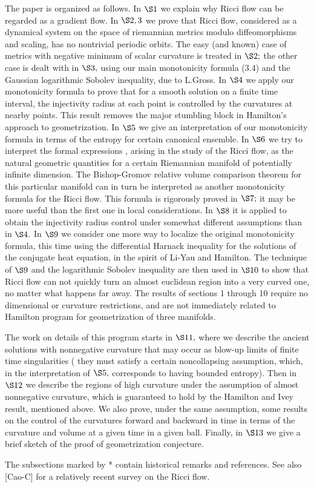 \documentclass[12pt]{article}
\theoremstyle{plain}
{\swapnumbers
\newtheorem{thm}{Theorem}[section]
\newtheorem{cor}[thm]{Corollary}
\newtheorem{lem}[thm]{Lemma}
\newtheorem{prop}[thm]{Proposition}
}
\theoremstyle{definition}
{\swapnumbers
\newtheorem{defn}[thm]{Definition}
\newtheorem{nota}[thm]{Notation}
\newtheorem{parag}[thm]{}
\newtheorem*{parstr}{\addtocounter{thm}{1}\thesection.\arabic{thm}*}
\newtheorem*{intropar}{\addtocounter{thm}{1}\arabic{thm}}
}
\theoremstyle{remark} {\swapnumbers
\newtheorem{rem}[thm]{Remark}
\newtheorem{exam}[thm]{Example}
\newtheorem{lemma}[thm]{Lemma}
\newtheorem{claim}[thm]{Claim}
}
\numberwithin{equation}{section}
\begin{document}
\begin{intropar}
The paper is organized as follows. In $\S 1$ we explain why Ricci
flow can be regarded as a gradient flow. In $\S 2,3$ we prove that
Ricci flow, considered as a dynamical system on the space of
riemannian metrics modulo diffeomorphisms and scaling, has no
nontrivial periodic orbits. The easy (and known) case of metrics
with negative minimum of scalar curvature is treated in $\S 2;$
the other case is dealt with in $\S 3,$ using our main
monotonicity formula (3.4) and the Gaussian logarithmic Sobolev
inequality, due to L.Gross. In $\S 4$ we apply our monotonicity
formula to prove that for a smooth  solution on a finite time
interval, the injectivity radius at each point is controlled by
the curvatures at nearby points. This result removes the major
stumbling block in Hamilton's approach to geometrization. In $\S
5$ we give an interpretation of our monotonicity formula in terms
of the entropy for certain canonical ensemble. In $\S 6$ we try to
interpret the formal expressions , arising in the study of the
Ricci flow, as the natural geometric quantities for a certain
Riemannian manifold of potentially infinite dimension. The
Bishop-Gromov relative volume comparison theorem for this
particular manifold can in turn be interpreted as another
monotonicity formula for the Ricci flow. This formula is
rigorously proved  in $\S 7;$ it may be more useful than the first
one in local considerations. In $\S 8$ it is applied to obtain the
injectivity radius control under somewhat different assumptions
than in $\S 4.$ In $\S 9$ we consider one more way to localize the
original monotonicity formula, this time using the differential
Harnack inequality for the solutions of the conjugate heat
equation, in the spirit of Li-Yau and Hamilton. The technique of
$\S 9$ and the logarithmic Sobolev inequality are then used in $\S
10$ to show that Ricci flow can not quickly turn an almost
euclidean region into  a very curved one, no matter what happens
far away. The results of sections 1 through 10 require no
dimensional or curvature restrictions, and are not immediately
related to Hamilton program for geometrization of three manifolds.
\par The work on details of this program starts in $\S 11,$ where
we describe the ancient solutions with nonnegative curvature that
may occur as blow-up limits of finite time singularities ( they
must satisfy a certain noncollapsing assumption, which, in the
interpretation of $\S 5,$ corresponds to having bounded entropy).
Then in $\S 12$ we describe the regions of high curvature under
the assumption of almost nonnegative curvature, which is
guaranteed to hold by the Hamilton and Ivey result, mentioned
above. We also prove, under the same assumption, some results on
the control of the curvatures forward and backward in time in
terms of the curvature and volume at a given time in a given ball.
Finally, in $\S 13$ we give a brief sketch of the proof of
geometrization conjecture.
\par The subsections marked by * contain historical remarks and
references. See also [Cao-C] for a relatively recent survey on the
Ricci flow.
\end{intropar}
\end{document}
